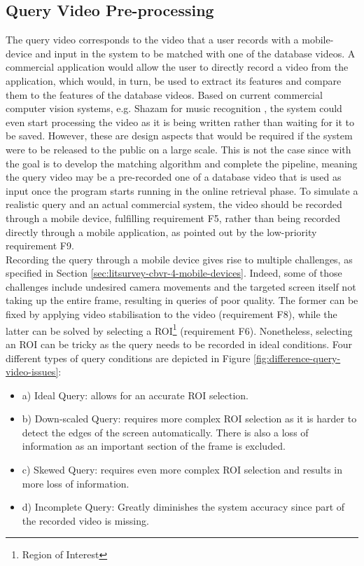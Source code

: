\subsection{Query Video Pre-processing}

The query video corresponds to the video that a user records with a mobile-device and input in the system to be matched with one of the database videos. A commercial application would allow the user to directly record a video from the application, which would, in turn, be used to extract its features and compare them to the features of the database videos. Based on current commercial computer vision systems, e.g. Shazam for music recognition \cite{shazam}, the system could even start processing the video as it is being written rather than waiting for it to be saved. However, these are design aspects that would be required if the system were to be released to the public on a large scale. This is not the case since with the goal is to develop the matching algorithm and complete the pipeline, meaning the query video may be a pre-recorded one of a database video that is used as input once the program starts running in the online retrieval phase. To simulate a realistic query and an actual commercial system, the video should be recorded through a mobile device, fulfilling requirement F5, rather than being recorded directly through a mobile application, as pointed out by the low-priority requirement F9.\\

Recording the query through a mobile device gives rise to multiple challenges, as specified in Section \ref{sec:litsurvey-cbvr-4-mobile-devices}. Indeed, some of those challenges include undesired camera movements and the targeted screen itself not taking up the entire frame, resulting in queries of poor quality. The former can be fixed by applying video stabilisation to the video (requirement F8), while the latter can be solved by selecting a ROI\footnote{Region of Interest} (requirement F6). Nonetheless, selecting an ROI can be tricky as the query needs to be recorded in ideal conditions. Four different types of query conditions are depicted in Figure \ref{fig:difference-query-video-issues}:
\begin{itemize}
    \item a) Ideal Query: allows for an accurate ROI selection.
    \item b) Down-scaled Query: requires more complex ROI selection as it is harder to detect the edges of the screen automatically. There is also a loss of information as an important section of the frame is excluded.
    \item c) Skewed Query: requires even more complex ROI selection and results in more loss of information.
    \item d) Incomplete Query: Greatly diminishes the system accuracy since part of the recorded video is missing.
\end{itemize}


